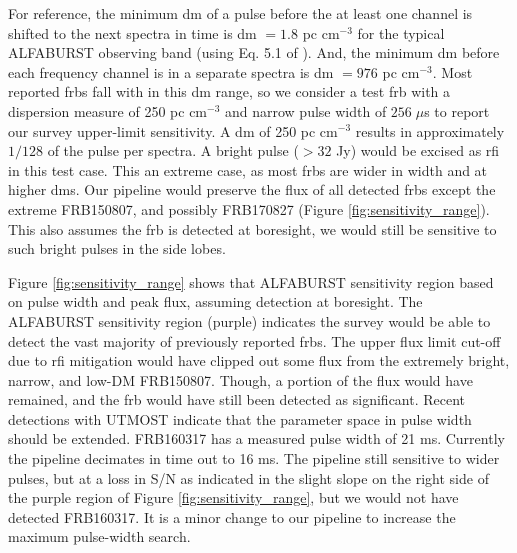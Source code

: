 \documentclass[a4paper,fleqn,usenatbib]{mnras}
\begin{document}
For reference, the minimum \gls{dm} of a pulse before the at least one channel
is shifted to the next spectra in time is \gls{dm} $=1.8$ pc cm$^{-3}$ for the
typical ALFABURST observing band (using Eq. 5.1 of \cite{2004hpa..book.....L}).
And, the minimum \gls{dm} before each frequency channel is in a separate spectra
is \gls{dm} $=976$ pc cm$^{-3}$. Most reported \glspl{frb} fall with in this
\gls{dm} range, so we consider a test \gls{frb} with a dispersion measure of 250
pc cm$^{-3}$ and narrow pulse width of $256 \; \mu$s to report our survey
upper-limit sensitivity. A \gls{dm} of 250 pc cm$^{-3}$ results in approximately
$1/128$ of the pulse per spectra. A bright pulse ($>32$ Jy) would be excised as
\gls{rfi} in this test case. This an extreme case, as most \glspl{frb} are wider
in width and at higher \glspl{dm}.  Our pipeline would preserve the flux of all
detected \glspl{frb} except the extreme FRB150807, and possibly FRB170827
(Figure \ref{fig:sensitivity_range}).  This also assumes the \gls{frb} is
detected at boresight, we would still be sensitive to such bright pulses in the
side lobes.

Figure \ref{fig:sensitivity_range} shows that ALFABURST sensitivity region based
on pulse width and peak flux, assuming detection at boresight. The ALFABURST
sensitivity region (purple) indicates the survey would be able to detect the
vast majority of previously reported \glspl{frb}. The upper flux limit cut-off
due to \gls{rfi} mitigation would have clipped out some flux from the extremely
bright, narrow, and low-DM FRB150807. Though, a portion of the flux would have
remained, and the \gls{frb} would have still been detected as significant.
Recent detections with UTMOST \citep{2017MNRAS.468.3746C,atel10697} indicate
that the parameter space in pulse width should be extended.  FRB160317 has a
measured pulse width of 21 ms. Currently the pipeline decimates in time out to
16 ms. The pipeline still sensitive to wider pulses, but at a loss in S/N
as indicated in the slight slope on the right side of the purple region of
Figure \ref{fig:sensitivity_range}, but we would not have detected FRB160317. It
is a minor change to our pipeline to increase the maximum pulse-width search.
\end{document}
